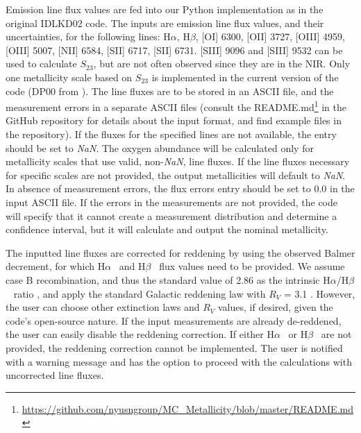 \documentclass{emulateapj}
\newcommand{\ha}{H$\alpha$}
\newcommand{\hb}{H$\beta$}
\begin{document}
Emission line flux values are fed into our Python implementation as in the original IDLKD02 code. The inputs are emission line flux values, and their uncertainties, for the following lines: \ha, \hb, [OI] 6300, [OII] 3727, [OIII] 4959, [OIII] 5007, [NII] 6584, [SII] 6717, [SII] 6731.  [SIII] 9096 and [SIII] 9532 can be used to calculate $S_{23}$, but are not often observed since they are in the NIR. Only one metallicity scale based on $S_{23}$ is implemented in the current version of the code (DP00 from \citealt{diaz00}). The line fluxes are to be stored in an ASCII file, and the measurement errors in a separate ASCII files (consult the README.md\footnote{\url{https://github.com/nyusngroup/MC_Metallicity/blob/master/README.md}} in the GitHub repository for details about the input format, and find example files in the repository). 
 If the fluxes for the specified lines are not available, the entry should be set to \emph{NaN}. The oxygen abundance will be calculated only for metallicity scales that use valid, non-\emph{NaN}, line fluxes. 
If the line fluxes necessary for specific scales are not provided, the output metallicities will default to \emph{NaN}. In absence of measurement errors, the flux errors entry should be set to 0.0 in the input ASCII file. If the errors in the measurements are not provided, the code will specify that it cannot create a measurement distribution and determine a confidence interval, but it will calculate and output the nominal metallicity.

The inputted line fluxes are corrected for reddening by using the observed Balmer decrement, for which \ha~ and  \hb~ flux values need to be provided. We assume case B recombination, and thus the standard value of 2.86 as the
intrinsic \ha/\hb~ ratio \citep{osterbrock89}, and apply the standard Galactic reddening law with $R_V$ = 3.1 \citep{cardelli89}. However, the user can choose other extinction laws and $R_V$ values, if desired, given the code's open-source nature. If the input measurements are already de-reddened, the user can easily disable the reddening correction. If either \ha~ or \hb~ are not provided, the reddening correction cannot be implemented. The user is notified with a warning message and has the option to proceed with the calculations with uncorrected line fluxes.
\end{document}
